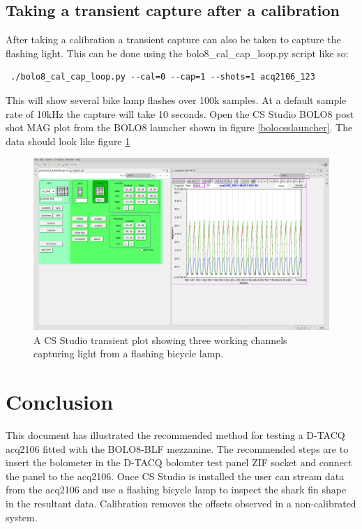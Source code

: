 \documentclass{article}
\begin{document}
\subsection{Taking a transient capture after a calibration}
After taking a calibration a transient capture can also be taken to capture the flashing light.
This can be done using the bolo8\_cal\_cap\_loop.py script like so:

\begin{verbatim} ./bolo8_cal_cap_loop.py --cal=0 --cap=1 --shots=1 acq2106_123\end{verbatim}

This will show several bike lamp flashes over 100k samples.
At a default sample rate of 10kHz the capture will take 10 seconds.
Open the CS Studio BOLO8 post shot MAG plot from the BOLO8 launcher shown in figure \ref{bolocsslauncher}.
The data should look like figure \ref{cssbolotransient}

\begin{figure} [hbt!]
	\centering
	\includegraphics[width=5.0in]{images/bolo-css-transient.png}
	\caption{A CS Studio transient plot showing three working channels capturing light from a flashing bicycle lamp.}
	\label{cssbolotransient}
\end{figure}

\section{Conclusion}
This document has illustrated the recommended method for testing a D-TACQ acq2106 fitted with the BOLO8-BLF mezzanine.
The recommended steps are to insert the bolometer in the D-TACQ bolomter test panel ZIF socket and connect the panel to the acq2106.
Once CS Studio is installed the user can stream data from the acq2106 and use a flashing bicycle lamp to inspect the shark fin shape in the resultant data. Calibration removes the offsets observed in a non-calibrated system. 
\end{document}
